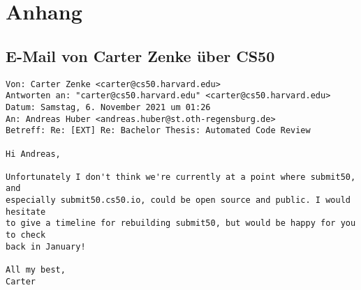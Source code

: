 \appendix
\section*{Anhang}
\renewcommand{\thesubsection}{\Alph{subsection}}

\subsection{E-Mail von Carter Zenke über CS50}\label{appendix:carter-zenke}
\begin{lstlisting}[style=Bash]
Von: Carter Zenke <carter@cs50.harvard.edu>
Antworten an: "carter@cs50.harvard.edu" <carter@cs50.harvard.edu>
Datum: Samstag, 6. November 2021 um 01:26
An: Andreas Huber <andreas.huber@st.oth-regensburg.de>
Betreff: Re: [EXT] Re: Bachelor Thesis: Automated Code Review
 
Hi Andreas,
 
Unfortunately I don't think we're currently at a point where submit50, and
especially submit50.cs50.io, could be open source and public. I would hesitate
to give a timeline for rebuilding submit50, but would be happy for you to check
back in January!
 
All my best,
Carter
\end{lstlisting}

\newpage




 

\newpage



 